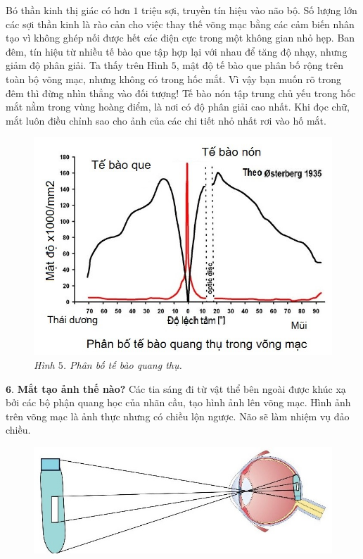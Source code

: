 \begin{multicols}{2}
	Bó thần kinh thị giác có hơn $1$ triệu sợi, truyền tín hiệu vào não bộ. Số lượng lớn các sợi thần kinh là rào cản cho việc thay thế võng mạc bằng các cảm biến nhân tạo vì không ghép nối được hết các điện cực trong một không gian nhỏ hẹp. 
	\vskip 0.1cm
	Ban đêm, tín hiệu từ nhiều tế bào que tập hợp lại với nhau để tăng độ nhạy, nhưng giảm độ phân giải. Ta thấy trên Hình $5$, mật độ tế bào que phân bố rộng trên toàn bộ võng mạc, nhưng không có trong hốc mắt. Vì vậy bạn muốn rõ trong đêm thì đừng nhìn thẳng vào đối tượng! Tế bào nón tập trung chủ yếu trong hốc mắt nằm trong vùng hoàng điểm, là nơi có độ phân giải cao nhất. Khi đọc chữ, mắt luôn điều chỉnh sao cho ảnh của các chi tiết nhỏ nhất rơi vào hố mắt.
	\begin{figure}[H]
		\vspace*{-5pt}
		\centering
		\captionsetup{labelformat= empty, justification=centering}
		\includegraphics[width= 0.9\linewidth]{5}
		\caption{\small\textit{\color{timhieukhoahoc}Hình $5$. Phân bố tế bào quang thụ.}}
		\vspace*{-10pt}
	\end{figure}	
	$\pmb{6.}$ \textbf{\color{timhieukhoahoc}Mắt tạo ảnh thế nào?}
	\vskip 0.1cm
	Các tia sáng đi từ vật thể bên ngoài được khúc xạ bởi các bộ phận quang học của nhãn cầu, tạo hình ảnh lên võng mạc. Hình ảnh trên võng mạc là ảnh thực nhưng có chiều lộn ngược. Não sẽ làm nhiệm vụ đảo chiều. 
	\begin{figure}[H]
		\vspace*{-5pt}
		\centering
		\captionsetup{labelformat= empty, justification=centering}
		\includegraphics[width= 1\linewidth]{6}

\end{figure}
\end{multicols}
